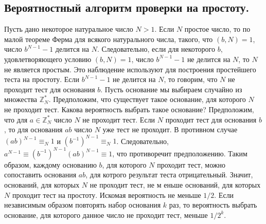 \subsection{Вероятностный алгоритм проверки на простоту.}
Пусть дано некоторое натуральное число $N > 1$. Если $N$ простое число, то по малой теореме Ферма для всякого натурального числа, такого, что $(b, N) = 1$, число $b^{N -1} - 1$ делится на $N$. Следовательно, если для некоторого $b$, удовлетворяющего условию $(b, N) = 1$, число $b^{N-1} - 1$ не делится на $N$, то $N$ не является простым. Это наблюдение используют для построения простейшего теста на простоту. Если $b^{N-1} - 1$  не делится на $N$, то говорим, что $N$ не проходит тест для основания $b$.
\newline
Пусть основание мы выбираем случайно из множества $\mathbb{Z}_N^*$. Предположим, что существует такое основание, для которого $N$ не проходит тест. Какова вероятность выбрать такое основание?
\newline
Предположим, что для $a \in \mathbb{Z}_N^*$ число $N$ не проходит тест. Если $N$ проходит тест для основания $b$, то для основания $ab$ число $N$ уже тест не проходит. В противном случае $(ab)^{N-1} \equiv_N 1$ и $(b^{-1})^{N-1} \equiv_N 1$. Следовательно, $a^{N-1} \equiv (b^{-1})^{N-1}(ab)^{N-1} \equiv 1$, что противоречит предположению. Таким образом, каждому основанию $b$, для которого $N$ проходит тест, можно сопоставить основания $ab$, для котрого результат теста отрицательный. Значит, оснований, для которых $N$ не проходит тест, не м еньше оснований, для которых $N$ проходит тест на простоту. Искомая вероятность не меньше $1/2$. Если независимым образом повторять набор основания $k$ раз, то вероятность выбрать основание, для которого данное число не проходит тест, меньше $1/2^k$.
\newpage

